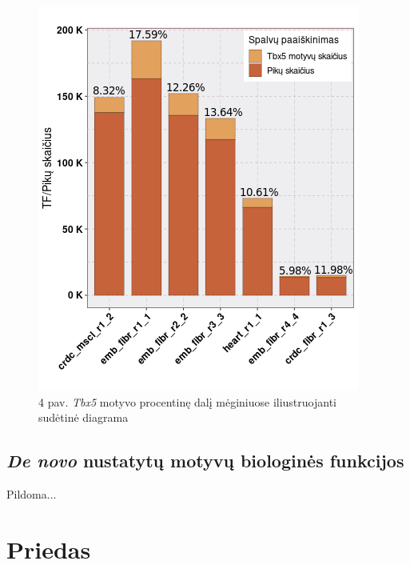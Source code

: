 \documentclass[12pt]{article}
\begin{document}
\begin{figure}[htb]
    \begin{center}
        \includegraphics[width=0.8\linewidth]{Figures/tf_hit_percentage.png}
        \caption*{4 pav. \emph{Tbx5} motyvo procentinę dalį mėginiuose
                  iliustruojanti sudėtinė diagrama}
    \end{center}
\end{figure}

\subsection{\emph{De novo} nustatytų motyvų biologinės funkcijos}
Pildoma...

\newpage



\begin{thebibliography}{99}
\end{thebibliography}
\newpage


\section{Priedas}
\end{document}
